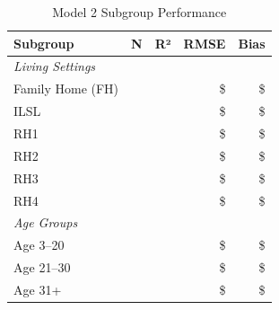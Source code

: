 \begin{table}[h]
\centering
\caption{Model 2 Subgroup Performance}
\begin{tabular}{lrrrr}
\toprule
\textbf{Subgroup} & \textbf{N} & \textbf{R²} & \textbf{RMSE} & \textbf{Bias} \\
\midrule
\multicolumn{5}{l}{\textit{Living Settings}} \\
Family Home (FH) & \ModelTwoSubgroupLivingSettingFHN{} & \ModelTwoSubgroupLivingSettingFHRSquared{} & \$\ModelTwoSubgroupLivingSettingFHRMSE{} & \$\ModelTwoSubgroupLivingSettingFHBias{} \\
ILSL & \ModelTwoSubgroupLivingSettingILSLN{} & \ModelTwoSubgroupLivingSettingILSLRSquared{} & \$\ModelTwoSubgroupLivingSettingILSLRMSE{} & \$\ModelTwoSubgroupLivingSettingILSLBias{} \\
RH1 & \ModelTwoSubgroupLivingSettingRHOneN{} & \ModelTwoSubgroupLivingSettingRHOneRSquared{} & \$\ModelTwoSubgroupLivingSettingRHOneRMSE{} & \$\ModelTwoSubgroupLivingSettingRHOneBias{} \\
RH2 & \ModelTwoSubgroupLivingSettingRHTwoN{} & \ModelTwoSubgroupLivingSettingRHTwoRSquared{} & \$\ModelTwoSubgroupLivingSettingRHTwoRMSE{} & \$\ModelTwoSubgroupLivingSettingRHTwoBias{} \\
RH3 & \ModelTwoSubgroupLivingSettingRHThreeN{} & \ModelTwoSubgroupLivingSettingRHThreeRSquared{} & \$\ModelTwoSubgroupLivingSettingRHThreeRMSE{} & \$\ModelTwoSubgroupLivingSettingRHThreeBias{} \\
RH4 & \ModelTwoSubgroupLivingSettingRHFourN{} & \ModelTwoSubgroupLivingSettingRHFourRSquared{} & \$\ModelTwoSubgroupLivingSettingRHFourRMSE{} & \$\ModelTwoSubgroupLivingSettingRHFourBias{} \\
\midrule
\multicolumn{5}{l}{\textit{Age Groups}} \\
Age 3--20 & \ModelTwoSubgroupAgeGroupAgeThreeTwentyN{} & \ModelTwoSubgroupAgeGroupAgeThreeTwentyRSquared{} & \$\ModelTwoSubgroupAgeGroupAgeThreeTwentyRMSE{} & \$\ModelTwoSubgroupAgeGroupAgeThreeTwentyBias{} \\
Age 21--30 & \ModelTwoSubgroupAgeGroupAgeTwentyOneThirtyN{} & \ModelTwoSubgroupAgeGroupAgeTwentyOneThirtyRSquared{} & \$\ModelTwoSubgroupAgeGroupAgeTwentyOneThirtyRMSE{} & \$\ModelTwoSubgroupAgeGroupAgeTwentyOneThirtyBias{} \\
Age 31+ & \ModelTwoSubgroupAgeGroupAgeThirtyOnePlusN{} & \ModelTwoSubgroupAgeGroupAgeThirtyOnePlusRSquared{} & \$\ModelTwoSubgroupAgeGroupAgeThirtyOnePlusRMSE{} & \$\ModelTwoSubgroupAgeGroupAgeThirtyOnePlusBias{} \\

\end{tabular}
\end{table}
